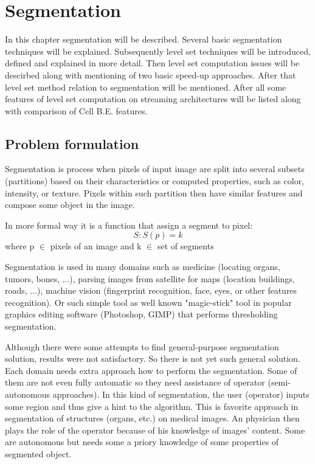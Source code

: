 \chapter{Segmentation}

In this chapter segmentation will be described. Several basic segmentation techniques will be explained.
Subsequently level set techniques will be introduced, defined and explained in more detail.
Then level set computation issues will be descirbed along with mentioning of two basic speed-up approaches.
After that level set method relation to segmentation will be mentioned.
After all some features of level set computation on streaming architectures will be listed along with comparison of Cell B.E. features.

\section{Problem formulation}
Segmentation is process when pixels of input image are split into several subsets (partitions) based on their characteristics or computed properties, such as color, intensity, or texture.
Pixels within such partition then have similar features and compose some object in the image.

In more formal way it is a function that assign a segment to pixel:
\begin{equation}
S: S(p) = k
\end{equation}
where p $\in$ pixels of an image and k $\in$ set of segments

Segmentation is used in many domains such as medicine (locating organs, tumors, bones, ...), parsing images from satellite for maps (location buildings, roads, ...), machine vision (fingerprint recognition, face, eyes, or other features recognition).
Or such simple tool as well known "magic-stick" tool in popular graphics editing software (Photoshop, GIMP) that performs thresholding segmentation.

Although there were some attempts to find general-purpose segmentation solution, results were not satisfactory.
So there is not yet such general solution. Each domain needs extra approach how to perform the segmentation.
Some of them are not even fully automatic so they need assistance of operator (semi-autonomous approaches).
In this kind of segmentation, the user (operator) inputs some region and thus give a hint to the algorithm.
This is favorite approach in segmentation of structures (organs, etc.) on medical images.
An physician then plays the role of the operator because of his knowledge of images' content.
Some are autonomous but needs some a priory knowledge of some properties of segmented object.

